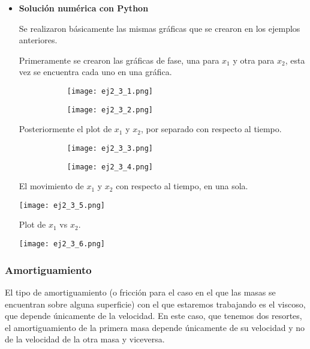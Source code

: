 \documentclass[12pt]{article}
\begin{document}
\begin{itemize}
\begin{itemize}
\item \textbf{Solución numérica con Python}

Se realizaron básicamente las mismas gráficas que se crearon en los ejemplos anteriores.

Primeramente se crearon las gráficas de fase, una para $x_1$ y otra para $x_2$, esta vez se encuentra cada uno en una gráfica.

\begin{figure}[h!]
\begin{subfigure}{.55\textwidth}
\centering
\texttt{[image: ej2\_3\_1.png]}
\end{subfigure}
\begin{subfigure}{.55\textwidth}
\centering
\texttt{[image: ej2\_3\_2.png]}
\end{subfigure}
\end{figure}

\clearpage
Posteriormente el plot de $x_1$ y $x_2$, por separado con respecto al tiempo. 

\begin{figure}[h!]
\begin{subfigure}{.55\textwidth}
\centering
\texttt{[image: ej2\_3\_3.png]}
\end{subfigure}
\begin{subfigure}{.55\textwidth}
\centering
\texttt{[image: ej2\_3\_4.png]}
\end{subfigure}
\end{figure}

El movimiento de $x_1$ y $x_2$ con respecto al tiempo, en una sola.

\begin{center}
        \texttt{[image: ej2\_3\_5.png]}
\end{center}

Plot de $x_1$ vs $x_2$.

\begin{center}
        \texttt{[image: ej2\_3\_6.png]}
\end{center}

\end{itemize}


\end{itemize}

\subsubsection{Amortiguamiento}
El tipo de amortiguamiento (o fricción para el caso en el que las masas se encuentran sobre alguna superficie) con el que estaremos trabajando es el viscoso, que depende únicamente de la velocidad. En este caso, que tenemos dos resortes, el amortiguamiento de la primera masa depende únicamente de su velocidad y no de la velocidad de la otra masa y viceversa. \\
\end{document}
